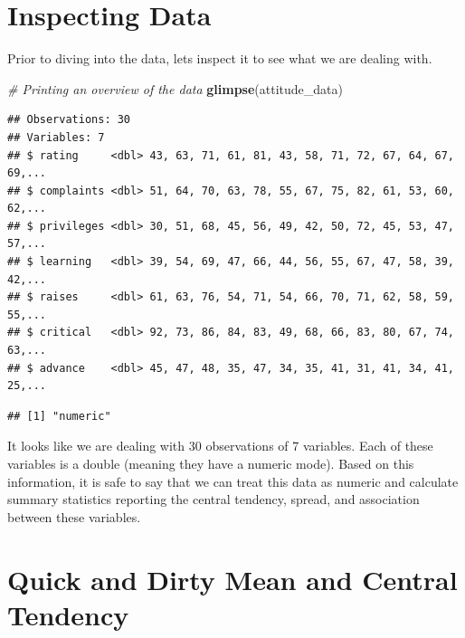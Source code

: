 \documentclass[]{book}
\newenvironment{Shaded}{\begin{snugshade}}{\end{snugshade}}
\newcommand{\CommentTok}[1]{\textcolor[rgb]{0.56,0.35,0.01}{\textit{#1}}}
\newcommand{\KeywordTok}[1]{\textcolor[rgb]{0.13,0.29,0.53}{\textbf{#1}}}
\newcommand{\NormalTok}[1]{#1}
\newcommand{\OperatorTok}[1]{\textcolor[rgb]{0.81,0.36,0.00}{\textbf{#1}}}
\theoremstyle{definition}
\theoremstyle{definition}
\theoremstyle{definition}
\theoremstyle{remark}
\begin{document}
\hypertarget{inspecting-data}{%
\section{Inspecting Data}\label{inspecting-data}}

Prior to diving into the data, lets inspect it to see what we are dealing with.

\begin{Shaded}
\begin{Highlighting}[]
\CommentTok{# Printing an overview of the data}
\KeywordTok{glimpse}\NormalTok{(attitude_data)}
\end{Highlighting}
\end{Shaded}

\begin{verbatim}
## Observations: 30
## Variables: 7
## $ rating     <dbl> 43, 63, 71, 61, 81, 43, 58, 71, 72, 67, 64, 67, 69,...
## $ complaints <dbl> 51, 64, 70, 63, 78, 55, 67, 75, 82, 61, 53, 60, 62,...
## $ privileges <dbl> 30, 51, 68, 45, 56, 49, 42, 50, 72, 45, 53, 47, 57,...
## $ learning   <dbl> 39, 54, 69, 47, 66, 44, 56, 55, 67, 47, 58, 39, 42,...
## $ raises     <dbl> 61, 63, 76, 54, 71, 54, 66, 70, 71, 62, 58, 59, 55,...
## $ critical   <dbl> 92, 73, 86, 84, 83, 49, 68, 66, 83, 80, 67, 74, 63,...
## $ advance    <dbl> 45, 47, 48, 35, 47, 34, 35, 41, 31, 41, 34, 41, 25,...
\end{verbatim}

\begin{Shaded}
\end{Shaded}

\begin{verbatim}
## [1] "numeric"
\end{verbatim}

It looks like we are dealing with 30 observations of 7 variables. Each of these variables is a double (meaning they have a numeric mode). Based on this information, it is safe to say that we can treat this data as numeric and calculate summary statistics reporting the central tendency, spread, and association between these variables.

\hypertarget{quick-and-dirty-mean-and-central-tendency}{%
\section{Quick and Dirty Mean and Central Tendency}\label{quick-and-dirty-mean-and-central-tendency}}
\end{document}
